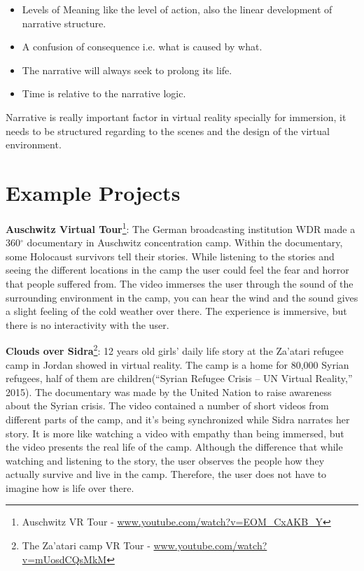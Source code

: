 \begin{itemize}
\item Levels of Meaning like the level of action, also the linear development of narrative structure.
\item A confusion of consequence i.e. what is caused by what.
\item The narrative will always seek to prolong its life. 
\item Time is relative to the narrative logic. 
\end{itemize}
Narrative is really important factor in virtual reality specially for immersion, it needs to be structured regarding to the scenes and the design of the virtual environment.  

\section{Example Projects}




\textbf{Auschwitz Virtual Tour}\footnote{Auschwitz VR Tour - \url{www.youtube.com/watch?v=EOM_CxAKB_Y}}:
The German broadcasting institution WDR made a 360$^{\circ}$ documentary in Auschwitz concentration camp. Within the documentary, some Holocaust survivors tell their stories. While listening to the stories and seeing the different locations in the camp the user could feel the fear and horror that people suffered from. The video immerses the user through the sound of the surrounding environment in the camp, you can hear the wind and the sound gives a slight feeling of the cold weather over there. The experience is immersive, but there is no interactivity with the user.





\textbf{Clouds over Sidra}\footnote{The Za’atari camp VR Tour - \url{www.youtube.com/watch?v=mUosdCQsMkM}}: 
12 years old girls’ daily life story at the Za’atari refugee camp in Jordan
showed in virtual reality. The camp is a home for 80,000 Syrian refugees, half of them are children(“Syrian Refugee Crisis – UN Virtual Reality,” 2015). The documentary was made by the United Nation to raise awareness about the Syrian crisis. The video contained a number of short videos from different parts of the camp, and it’s being synchronized while Sidra narrates her story.
It is more like watching a video with empathy than being immersed, but
the video presents the real life of the camp. Although the difference that while watching and
listening to the story, the user observes the people how they actually survive and live in the
camp. Therefore, the user does not have to imagine how is life over there.



